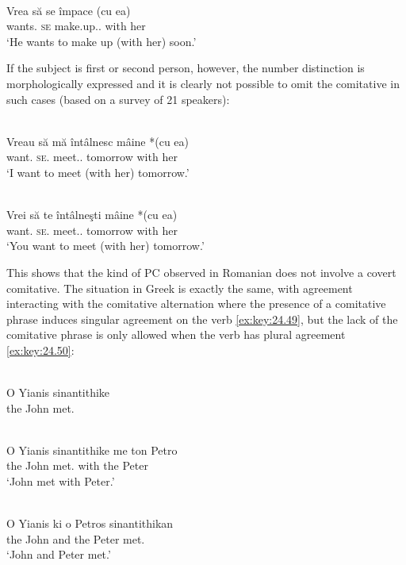 \documentclass[output=paper]{langsci/langscibook}
\begin{document}
\ea%
    \label{ex:key:24.48}\\
	\gll Vrea   să   se   împace     (cu   ea)\\
    wants.\Tsg{} \Sbjv{}   \textsc{se}   make.up.\Sbjv{}.\Third{}  \hphantom{(}with  her\\
	\glt ‘He wants to make up (with her) soon.’
\z

If the subject is first or second person, however, the number distinction is
morphologically expressed and it is clearly not possible to omit the comitative
in such cases (based on a survey of 21 speakers):

\ea%
    \label{ex:key:24.49}\\
	\gll Vreau   să   mă     întâlnesc    mâine     *(cu ea)\\
		want.\Fsg{}  \Sbjv{}  \textsc{se}.\Fsg{}  meet.\Sbjv{}.\Fsg{}  tomorrow \hphantom{*(}with her\\
	\glt ‘I want to meet (with her) tomorrow.'
\z

\ea%
    \label{ex:key:24.50}\\
	\gll Vrei   să   te     întâlneşti     mâine     *(cu ea)\\
		want.\Ssg{}  \Sbjv{}  \textsc{se}.\Ssg{}  meet.\Sbjv{}.\Ssg{}  tomorrow \hphantom{*(}with her\\
	\glt ‘You want to meet (with her) tomorrow.'
\z

This shows that the kind of \gls{PC} observed in
Romanian does not involve a covert comitative. The situation in Greek is
exactly the same, with agreement interacting with the comitative alternation
where the presence of a comitative phrase induces singular agreement on the
verb \eqref{ex:key:24.49}, but the lack of the comitative phrase is only allowed when the verb
has plural agreement \eqref{ex:key:24.50}:

\ea%
    \label{ex:key:24.51}\\
	\gll \llap{*}O Yianis sinantithike\\
		the John  met.\Tsg{}\\
    \glt
\z

\ea%
    \label{ex:key:24.52}\\
	\gll O Yianis sinantithike me ton Petro\\
		the John met.\Tsg{}    with the Peter\\
	\glt ‘John met with Peter.’
\z

\ea%
    \label{ex:key:24.53}\\
	\gll O Yianis ki o Petros sinantithikan\\
		the John and the Peter met.\Tpl{} \\
	\glt ‘John and Peter met.’
\z
\end{document}
